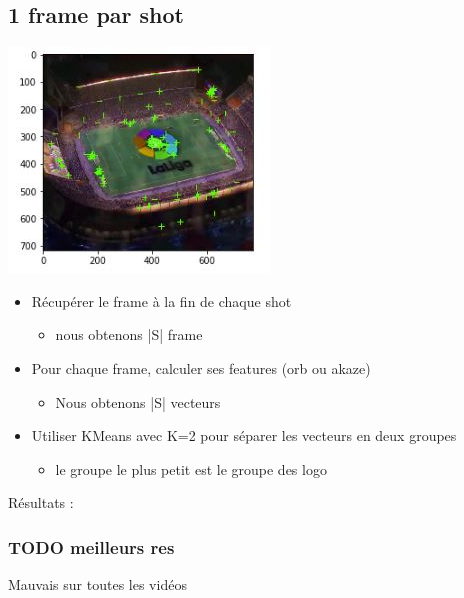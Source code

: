 \documentclass[11pt]{article}
\begin{document}
\subsection{1 frame par shot}
\label{sec-6-4}
\includegraphics[width=.9\linewidth]{orb_simple_res.JPG}
\begin{itemize}
\item Récupérer le frame à la fin de chaque shot
\begin{itemize}
\item nous obtenons |S| frame
\end{itemize}
\item Pour chaque frame, calculer ses features (orb ou akaze)
\begin{itemize}
\item Nous obtenons |S| vecteurs
\end{itemize}
\item Utiliser KMeans avec K=2 pour séparer les vecteurs en deux groupes 
\begin{itemize}
\item le groupe le plus petit est le groupe des logo
\end{itemize}
\end{itemize}

Résultats : 
\subsubsection{{\bfseries\sffamily TODO} meilleurs res}
\label{sec-6-4-1}
Mauvais sur toutes les vidéos
\end{document}
